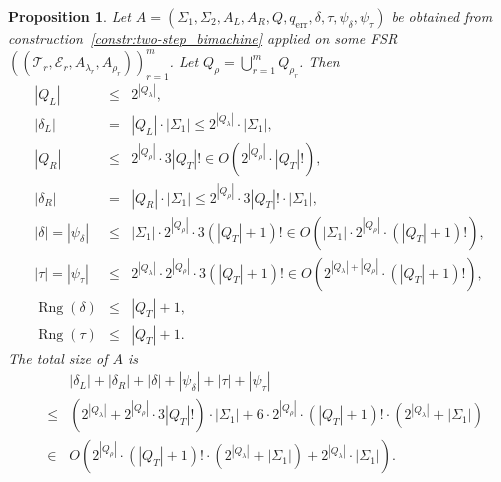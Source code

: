 \documentclass{article}
\newtheorem{proposition}[definition]{Proposition}
\newcommand{\len}[1]{\ensuremath{\left| #1 \right|}}
\DeclareMathOperator{\Rng}{Rng}
\begin{document}
	\begin{proposition} \label{prop:size_two-step_bimachine}
		Let $A = (\Sigma_1, \Sigma_2, A_L, A_R, Q, q_\mathrm{err}, \delta, \tau, \psi_\delta, \psi_\tau)$ be obtained from construction~\ref{constr:two-step_bimachine} applied on some FSR $((\mathcal{T}_r, \mathcal{E}_r, A_{\lambda_r}, A_{\rho_r}))_{r=1}^m$. Let $Q_\rho = \bigcup_{r=1}^m Q_{\rho_r}$. Then
		\begin{eqnarray*}
			\len{Q_L} &\le& 2^{\len{Q_\lambda}}, \\
			\len{\delta_L} &=& \len{Q_L}\cdot \len{\Sigma_1} \le 2^{\len{Q_\lambda}}\cdot \len{\Sigma_1}, \\
			\len{Q_R} &\le& 2^{\len{Q_\rho}}\cdot 3\len{Q_T}!\in O(2^{\len{Q_\rho}}\cdot \len{Q_T}!), \\
			\len{\delta_R} &=& \len{Q_R}\cdot \len{\Sigma_1} \le 2^{\len{Q_\rho}}\cdot 3\len{Q_T}!\cdot \len{\Sigma_1}, \\
			\len{\delta} = \len{\psi_\delta} &\le& \len{\Sigma_1}\cdot 2^{\len{Q_\rho}}\cdot 3(\len{Q_T}+1)!
				\in O(\len{\Sigma_1}\cdot 2^{\len{Q_\rho}}\cdot(\len{Q_T}+1)!), \\
			\len{\tau} = \len{\psi_\tau} &\le& 2^{\len{Q_\lambda}}\cdot 2^{\len{Q_\rho}}\cdot 3(\len{Q_T}+1)!
				\in O(2^{\len{Q_\lambda}+\len{Q_\rho}}\cdot(\len{Q_T}+1)!), \\
			\Rng(\delta) &\le& \len{Q_T} + 1, \\
			\Rng(\tau) &\le& \len{Q_T} + 1.
		\end{eqnarray*}
		The total size of $A$ is
		\begin{eqnarray*}
			&&\len{\delta_L} + \len{\delta_R} + \len{\delta} + \len{\psi_\delta} + \len{\tau} + \len{\psi_\tau} \\
			&\le& (2^{\len{Q_\lambda}} + 2^{\len{Q_\rho}}\cdot 3\len{Q_T}!)\cdot\len{\Sigma_1} + 6\cdot 2^{\len{Q_\rho}}\cdot (\len{Q_T}+1)!\cdot(2^{\len{Q_\lambda}} + \len{\Sigma_1}) \\
			&\in& O(2^{\len{Q_\rho}}\cdot(\len{Q_T}+1)!\cdot (2^{\len{Q_\lambda}} + \len{\Sigma_1}) + 2^{\len{Q_\lambda}}\cdot \len{\Sigma_1}).
		\end{eqnarray*}
	\end{proposition}
\end{document}
